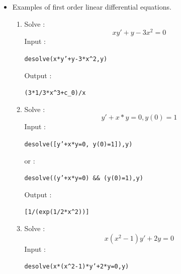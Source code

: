 \documentclass[a4paper,11pt]{book}
\begin{document}
\begin{itemize}
\begin{enumerate}
Input :
\begin{center}{\tt desolve([y''+y=cos(x),y(0)\verb|^|2=1,y'(0)=1],y)}
\end{center}
Output :
\begin{center}{\tt [-cos(x)+(x+2)/2*sin(x),cos(x)+(x+2)/2*sin(x)]}\end{center}
each component of this list is a solution (we have two solutions).
\item
Solve :
$$y''+2y'+y=0$$
Input :
\begin{center}{\tt desolve(y''+2*y'+y=0,y)}\end{center}
Output :
\begin{center}{\tt (x*c\_0+x*c\_1+c\_0)*exp(-x)}\end{center}
the solution depends of 2 constants of integration : 
{\tt c\_0, c\_1} ({\tt y(0)=c\_0} and {\tt y'(0)=c\_1}).
\item
Solve :
$$y''-6y'+9y=xe^{3x}$$
Input:
\begin{center}{\tt desolve(y''-6*y'+9*y=(x*exp(3*x),y)}\end{center}
Output :
\begin{center}{\tt (x\verb|^|3+(-(18*x))*c\_0+6*x*c\_1+6*c\_0)*1/6*exp(3*x)}\end{center}
the solution depends on 2  constants of integration : 
{\tt c\_0, c\_1} ({\tt y(0)=c\_0} and {\tt y'(0)=c\_1}).
\end{enumerate}
\item Examples of first order linear differential equations.
\begin{enumerate}
\item 
Solve :
$$xy'+y-3x^2=0$$
Input :
\begin{center}{\tt desolve(x*y'+y-3*x\verb|^|2,y)}\end{center}
Output :
\begin{center}{\tt(3*1/3*x\verb|^|3+c\_0)/x }\end{center}
\item
Solve :
$$y'+x*y=0, y(0)=1$$
Input :
\begin{center}{\tt desolve([y'+x*y=0, y(0)=1]),y)}\end{center}
or :
\begin{center}{\tt desolve((y'+x*y=0) \&\& (y(0)=1),y)}\end{center}
Output  :
\begin{center}{\tt [1/(exp(1/2*x\verb|^|2))]}\end{center} 
\item
Solve :
$$x(x^2-1)y'+2y=0$$
Input :
\begin{center}{\tt desolve(x*(x\verb|^|2-1)*y'+2*y=0,y)}\end{center}

\end{enumerate}
\end{itemize}
\end{document}
